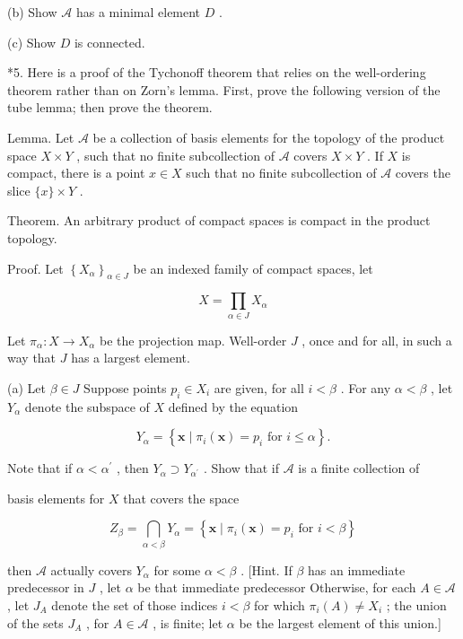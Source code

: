 (b) Show \(\mathcal{A}\) has a minimal element \(D\) .

(c) Show \(D\) is connected.

*5. Here is a proof of the Tychonoff theorem that relies on the well-ordering theorem rather than on Zorn's lemma. First, prove the following version of the tube lemma; then prove the theorem.

Lemma. Let \(\mathcal{A}\) be a collection of basis elements for the topology of the product space \(X \times  Y\) , such that no finite subcollection of \(\mathcal{A}\) covers \(X \times  Y\) . If \(X\) is compact, there is a point \(x \in  X\) such that no finite subcollection of \(\mathcal{A}\) covers the slice \(\{ x\}  \times  Y\) .

Theorem. An arbitrary product of compact spaces is compact in the product topology.

Proof. Let \({\left\{  {X}_{\alpha }\right\}  }_{\alpha  \in  J}\) be an indexed family of compact spaces, let

\[
X = \mathop{\prod }\limits_{{\alpha  \in  J}}{X}_{\alpha }
\]

Let \({\pi }_{\alpha } : X \rightarrow  {X}_{\alpha }\) be the projection map. Well-order \(J\) , once and for all, in such a way that \(J\) has a largest element.

(a) Let \(\beta  \in  J\) Suppose points \({p}_{i} \in  {X}_{i}\) are given, for all \(i < \beta\) . For any \(\alpha  < \beta\) , let \({Y}_{\alpha }\) denote the subspace of \(X\) defined by the equation

\[
{Y}_{\alpha } = \left\{  {\mathbf{x} \mid  {\pi }_{i}\left( \mathbf{x}\right)  = {p}_{i}\text{ for }i \leq  \alpha }\right\}  .
\]

Note that if \(\alpha  < {\alpha }^{\prime }\) , then \({Y}_{\alpha } \supset  {Y}_{{\alpha }^{\prime }}\) . Show that if \(\mathcal{A}\) is a finite collection of

basis elements for \(X\) that covers the space

\[
{Z}_{\beta } = \mathop{\bigcap }\limits_{{\alpha  < \beta }}{Y}_{\alpha } = \left\{  {\mathbf{x} \mid  {\pi }_{i}\left( \mathbf{x}\right)  = {p}_{i}\text{ for }i < \beta }\right\}
\]

then \(\mathcal{A}\) actually covers \({Y}_{\alpha }\) for some \(\alpha  < \beta\) . [Hint. If \(\beta\) has an immediate predecessor in \(J\) , let \(\alpha\) be that immediate predecessor Otherwise, for each \(A \in  \mathcal{A}\) , let \({J}_{A}\) denote the set of those indices \(i < \beta\) for which \({\pi }_{i}\left( A\right)  \neq  {X}_{i}\) ; the union of the sets \({J}_{A}\) , for \(A \in  \mathcal{A}\) , is finite; let \(\alpha\) be the largest element of this union.]

